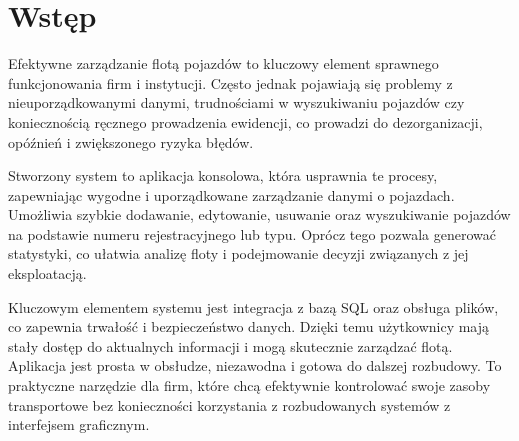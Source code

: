 ﻿\chapter*{Wstęp}


Efektywne zarządzanie flotą pojazdów to kluczowy element sprawnego funkcjonowania firm i instytucji. Często jednak pojawiają się problemy z nieuporządkowanymi danymi, trudnościami w wyszukiwaniu pojazdów czy koniecznością ręcznego prowadzenia ewidencji, co prowadzi do dezorganizacji, opóźnień i zwiększonego ryzyka błędów.  

Stworzony system to aplikacja konsolowa, która usprawnia te procesy, zapewniając wygodne i uporządkowane zarządzanie danymi o pojazdach. Umożliwia szybkie dodawanie, edytowanie, usuwanie oraz wyszukiwanie pojazdów na podstawie numeru rejestracyjnego lub typu. Oprócz tego pozwala generować statystyki, co ułatwia analizę floty i podejmowanie decyzji związanych z jej eksploatacją.  

Kluczowym elementem systemu jest integracja z bazą SQL oraz obsługa plików, co zapewnia trwałość i bezpieczeństwo danych. Dzięki temu użytkownicy mają stały dostęp do aktualnych informacji i mogą skutecznie zarządzać flotą. Aplikacja jest prosta w obsłudze, niezawodna i gotowa do dalszej rozbudowy. To praktyczne narzędzie dla firm, które chcą efektywnie kontrolować swoje zasoby transportowe bez konieczności korzystania z rozbudowanych systemów z interfejsem graficznym.



